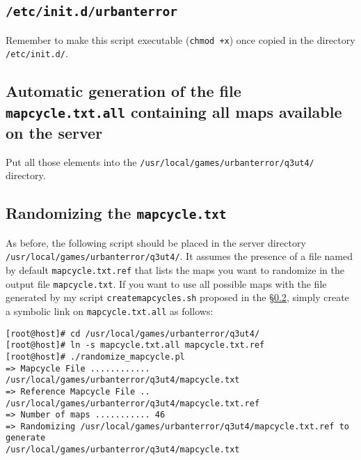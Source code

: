 

\subsection{\texttt{/etc/init.d/urbanterror}}
\label{anx:init.d:urbanterror}

Remember to make this script executable (\texttt{chmod +x}) once copied in the
directory \texttt{/etc/init.d/}.




\subsection{Automatic generation of the file \texttt{mapcycle.txt.all}
  containing all maps available on the server}
\label{anx:mapcycle:all}

Put all those elements into the \texttt{/usr/local/games/urbanterror/q3ut4/}
directory. 




\subsection{Randomizing the \texttt{mapcycle.txt}}
\label{anx:mapcycle:random}

As before, the following script should be placed in the server directory\\
\texttt{/usr/local/games/urbanterror/q3ut4/}. It assumes the presence of a file
named by default \texttt{mapcycle.txt.ref} that lists the maps you want to
randomize in the output file \texttt{mapcycle.txt}. 
If you want to use all possible maps with the file generated by my script
\texttt{createmapcycles.sh} proposed in the \S\ref{anx:mapcycle:all}, simply
create a symbolic link on \texttt{mapcycle.txt.all} as follows: 
\begin{lstlisting}[style=command]
[root@host]# cd /usr/local/games/urbanterror/q3ut4/
[root@host]# ln -s mapcycle.txt.all mapcycle.txt.ref
[root@host]# ./randomize_mapcycle.pl 
=> Mapcycle File ............ /usr/local/games/urbanterror/q3ut4/mapcycle.txt
=> Reference Mapcycle File .. /usr/local/games/urbanterror/q3ut4/mapcycle.txt.ref
=> Number of maps ........... 46
=> Randomizing /usr/local/games/urbanterror/q3ut4/mapcycle.txt.ref to generate 
/usr/local/games/urbanterror/q3ut4/mapcycle.txt


\end{lstlisting}

